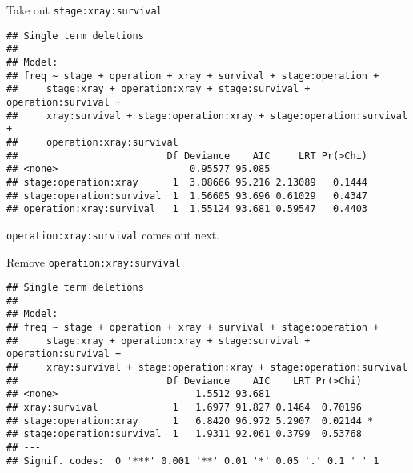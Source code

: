 \begin{frame}[fragile]{Take out \texttt{stage:xray:survival}}
    
{\small  
\begin{knitrout}
\color{fgcolor}\begin{kframe}
\begin{alltt}
\hlkwb{=}\hlopt{~}\hlopt{-}\hlopt{:}\hlopt{:}
\hlstd{=}\hlstd{)}
\end{alltt}
\begin{verbatim}
## Single term deletions
## 
## Model:
## freq ~ stage + operation + xray + survival + stage:operation + 
##     stage:xray + operation:xray + stage:survival + operation:survival + 
##     xray:survival + stage:operation:xray + stage:operation:survival + 
##     operation:xray:survival
##                          Df Deviance    AIC     LRT Pr(>Chi)
## <none>                       0.95577 95.085                 
## stage:operation:xray      1  3.08666 95.216 2.13089   0.1444
## stage:operation:survival  1  1.56605 93.696 0.61029   0.4347
## operation:xray:survival   1  1.55124 93.681 0.59547   0.4403
\end{verbatim}
\end{kframe}
\end{knitrout}
}

\texttt{operation:xray:survival} comes out next.
   
\end{frame}

\begin{frame}[fragile]{Remove \texttt{operation:xray:survival}}
  
{\small  
\begin{knitrout}
\color{fgcolor}\begin{kframe}
\begin{alltt}
\hlkwb{=}\hlopt{~}\hlopt{-}\hlopt{:}\hlopt{:}
\hlstd{=}\hlstd{)}
\end{alltt}
\begin{verbatim}
## Single term deletions
## 
## Model:
## freq ~ stage + operation + xray + survival + stage:operation + 
##     stage:xray + operation:xray + stage:survival + operation:survival + 
##     xray:survival + stage:operation:xray + stage:operation:survival
##                          Df Deviance    AIC    LRT Pr(>Chi)  
## <none>                        1.5512 93.681                  
## xray:survival             1   1.6977 91.827 0.1464  0.70196  
## stage:operation:xray      1   6.8420 96.972 5.2907  0.02144 *
## stage:operation:survival  1   1.9311 92.061 0.3799  0.53768  
## ---
## Signif. codes:  0 '***' 0.001 '**' 0.01 '*' 0.05 '.' 0.1 ' ' 1
\end{verbatim}
\end{kframe}
\end{knitrout}
}
   
  
\end{frame}

